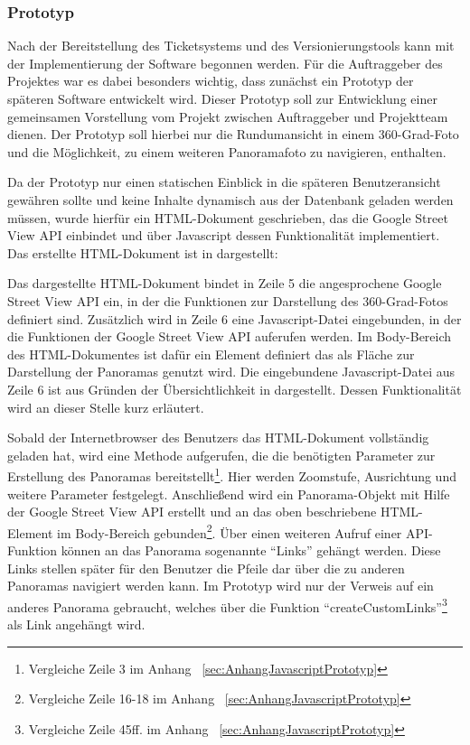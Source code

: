 \subsubsection{Prototyp}
\label{sec:Prototyp}

Nach der Bereitstellung des Ticketsystems und des Versionierungstools kann mit
der Implementierung der Software begonnen werden. Für die Auftraggeber des
Projektes war es dabei besonders wichtig, dass zunächst ein Prototyp der
späteren Software entwickelt wird. Dieser Prototyp soll zur Entwicklung einer
gemeinsamen Vorstellung vom Projekt zwischen Auftraggeber und Projektteam
dienen. Der Prototyp soll hierbei nur die Rundumansicht in einem
360-Grad-Foto und die Möglichkeit, zu einem weiteren Panoramafoto zu navigieren,
enthalten.

Da der Prototyp nur einen statischen Einblick in die späteren Benutzeransicht
gewähren sollte und keine Inhalte dynamisch aus der Datenbank geladen werden
müssen, wurde hierfür ein HTML-Dokument geschrieben, das die Google Street View
API einbindet und über Javascript dessen Funktionalität implementiert. Das
erstellte HTML-Dokument ist in  dargestellt:



Das dargestellte HTML-Dokument bindet in Zeile 5 die angesprochene Google
Street View API ein, in der die Funktionen zur Darstellung des 360-Grad-Fotos
definiert sind. Zusätzlich wird in Zeile 6 eine Javascript-Datei eingebunden,
in der die Funktionen der Google Street View API auferufen werden. Im
Body-Bereich des HTML-Dokumentes ist dafür ein Element definiert das als Fläche
zur Darstellung der Panoramas genutzt wird. Die eingebundene Javascript-Datei
aus Zeile 6 ist aus Gründen der Übersichtlichkeit
in  dargestellt. Dessen Funktionalität
wird an dieser Stelle kurz erläutert.

Sobald der Internetbrowser des Benutzers das HTML-Dokument vollständig geladen
hat, wird eine Methode aufgerufen, die die benötigten Parameter zur Erstellung
des Panoramas bereitstellt\footnote{Vergleiche Zeile 3 im Anhang
~\ref{sec:AnhangJavascriptPrototyp}}. Hier werden Zoomstufe, Ausrichtung und
weitere Parameter festgelegt. Anschließend wird ein Panorama-Objekt mit Hilfe
der Google Street View API erstellt und an das oben beschriebene HTML-Element
im Body-Bereich gebunden\footnote{Vergleiche Zeile 16-18 im Anhang
~\ref{sec:AnhangJavascriptPrototyp}}. Über einen weiteren Aufruf einer
API-Funktion können an das Panorama sogenannte "`Links"' gehängt werden. Diese
Links stellen später für den Benutzer die Pfeile dar über die zu anderen
Panoramas navigiert werden kann. Im Prototyp wird nur der Verweis auf ein
anderes Panorama gebraucht, welches über die Funktion
"`createCustomLinks"'\footnote{Vergleiche Zeile 45ff. im Anhang
~\ref{sec:AnhangJavascriptPrototyp}} als Link angehängt wird.


